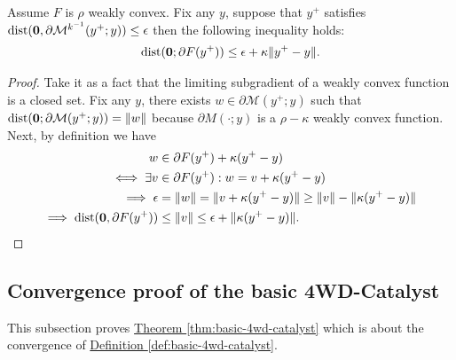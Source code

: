 \documentclass[12pt]{article}
\begin{document}
    \begin{lemma}\label{app:lemma:ncnvx-catalyst-stationary-cond}
        Assume $F$ is $\rho$ weakly convex. 
        Fix any $y$, suppose that $y^+$ satisfies $\operatorname{dist}(\mathbf 0,\partial \mathcal M^{k^{-1}}(y^+; y)) \le \epsilon$ then the following inequality holds: 
        \begin{align*}
            \operatorname{dist}(\mathbf 0; \partial F(y^+)) 
            \le \epsilon + \kappa\Vert y^+ - y\Vert. 
        \end{align*}
    \end{lemma}
    \begin{proof}
        Take it as a fact that the limiting subgradient of a weakly convex function is a closed set. 
        Fix any $y$, there exists $w \in \partial \mathcal M(y^+; y)$ such that $\operatorname{dist}(\mathbf 0; \partial {\mathcal M}(y^+; y)) = \Vert w\Vert$ because $\partial M(\cdot;y)$ is a $\rho - \kappa$ weakly convex function. 
        Next, by definition we have
        \begin{align*}
            w &\in \partial F(y^+) + \kappa(y^+ - y)
            \\
            \iff 
            \exists v &
            \in \partial  F(y^+): 
            w = v + \kappa(y^+ - y)
            \\
            \implies 
            \epsilon &= 
            \Vert w\Vert = \Vert v + \kappa(y^+ - y)\Vert 
            \ge \Vert v\Vert - \Vert \kappa(y^+ - y)\Vert
            \\
            \implies 
            \operatorname{dist}(\mathbf 0, \partial F(y^+)) &\le 
            \Vert v\Vert 
            \le \epsilon + \Vert \kappa(y^+ - y)\Vert. 
        \end{align*}

    \end{proof}
    \subsection{Convergence proof of the basic 4WD-Catalyst}
        This subsection proves 
        \hyperref[thm:basic-4wd-catalyst]{Theorem \ref*{thm:basic-4wd-catalyst}}
        which is about the convergence of 
        \hyperref[def:basic-4wd-catalyst]{Definition \ref*{def:basic-4wd-catalyst}}. 
        
\end{document}
